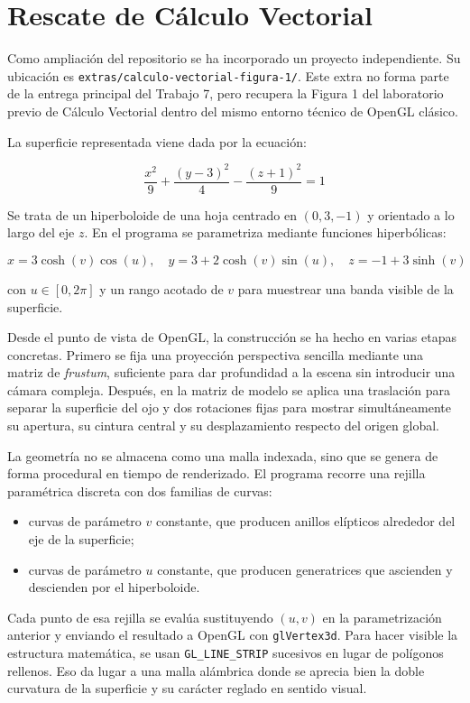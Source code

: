 \documentclass[12pt,a4paper]{article}
\begin{document}
\section{Rescate de Cálculo Vectorial}
Como ampliación del repositorio se ha incorporado un proyecto independiente. Su ubicación es \texttt{extras/calculo-vectorial-figura-1/}. Este extra no forma parte de la entrega principal del Trabajo 7, pero recupera la Figura 1 del laboratorio previo de Cálculo Vectorial dentro del mismo entorno técnico de OpenGL clásico.

La superficie representada viene dada por la ecuación:

\[
\frac{x^2}{9} + \frac{(y-3)^2}{4} - \frac{(z+1)^2}{9} = 1
\]

Se trata de un hiperboloide de una hoja centrado en $(0, 3, -1)$ y orientado a lo largo del eje $z$. En el programa se parametriza mediante funciones hiperbólicas:

\[
x = 3 \cosh(v) \cos(u), \quad
y = 3 + 2 \cosh(v) \sin(u), \quad
z = -1 + 3 \sinh(v)
\]

con $u \in [0, 2\pi]$ y un rango acotado de $v$ para muestrear una banda visible de la superficie.

Desde el punto de vista de OpenGL, la construcción se ha hecho en varias etapas concretas. Primero se fija una proyección perspectiva sencilla mediante una matriz de \emph{frustum}, suficiente para dar profundidad a la escena sin introducir una cámara compleja. Después, en la matriz de modelo se aplica una traslación para separar la superficie del ojo y dos rotaciones fijas para mostrar simultáneamente su apertura, su cintura central y su desplazamiento respecto del origen global.

La geometría no se almacena como una malla indexada, sino que se genera de forma procedural en tiempo de renderizado. El programa recorre una rejilla paramétrica discreta con dos familias de curvas:

\begin{itemize}[leftmargin=*]
    \item curvas de parámetro $v$ constante, que producen anillos elípticos alrededor del eje de la superficie;
    \item curvas de parámetro $u$ constante, que producen generatrices que ascienden y descienden por el hiperboloide.
\end{itemize}

Cada punto de esa rejilla se evalúa sustituyendo $(u,v)$ en la parametrización anterior y enviando el resultado a OpenGL con \texttt{glVertex3d}. Para hacer visible la estructura matemática, se usan \texttt{GL\_LINE\_STRIP} sucesivos en lugar de polígonos rellenos. Eso da lugar a una malla alámbrica donde se aprecia bien la doble curvatura de la superficie y su carácter reglado en sentido visual.
\end{document}
